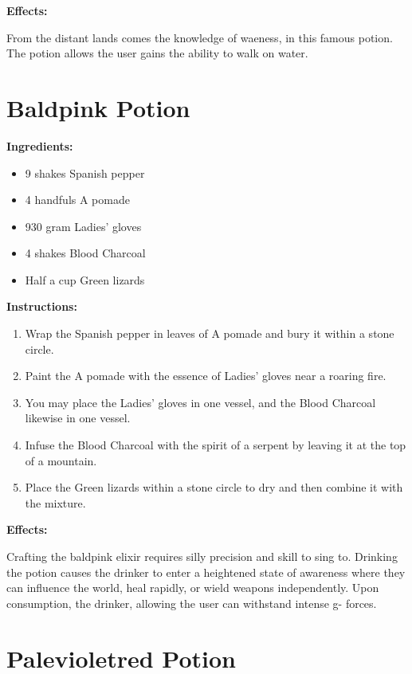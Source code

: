 \documentclass{article}
\begin{document}
\textbf{Effects:}

From the distant lands comes the knowledge of waeness, in this famous potion. The potion allows the user gains the ability to walk on water.

\newpage
\section*{Baldpink Potion}

\textbf{Ingredients:}

\begin{itemize}
  \item 9 shakes Spanish pepper
  \item 4 handfuls A pomade
  \item 930 gram Ladies' gloves
  \item 4 shakes Blood Charcoal
  \item Half a cup Green lizards
\end{itemize}

\textbf{Instructions:}

\begin{enumerate}
  \item Wrap the Spanish pepper in leaves of A pomade and bury it within a stone circle.
  \item Paint the A pomade with the essence of Ladies' gloves near a roaring fire.
  \item You may place the Ladies' gloves in one vessel, and the Blood Charcoal likewise in one vessel.
  \item Infuse the Blood Charcoal with the spirit of a serpent by leaving it at the top of a mountain.
  \item Place the Green lizards within a stone circle to dry and then combine it with the mixture.
\end{enumerate}

\textbf{Effects:}

Crafting the baldpink elixir requires silly precision and skill to sing to. Drinking the potion causes the drinker to enter a heightened state of awareness where they can influence the world, heal rapidly, or wield weapons independently. Upon consumption, the drinker, allowing the user can withstand intense g- forces.

\newpage
\section*{Palevioletred Potion}
\end{document}
